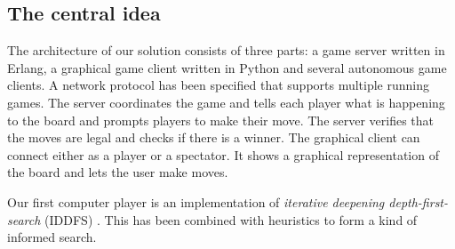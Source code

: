 \documentclass[a4paper,11pt]{article}
\begin{document}
\subsection{The central idea}

The architecture of our solution consists of three parts: a game
server written in Erlang, a graphical game client written in Python
and several autonomous game clients. A network protocol has been
specified that supports multiple running games. The server coordinates
the game and tells each player what is happening to the board and
prompts players to make their move. The server verifies that the moves
are legal and checks if there is a winner. The graphical client can
connect either as a player or a spectator. It shows a graphical
representation of the board and lets the user make moves.


Our first computer player is an implementation of \emph{iterative
  deepening depth-first-search} (IDDFS) \cite{aimodern}. This has been
combined with heuristics to form a kind of informed search.

\end{document}

